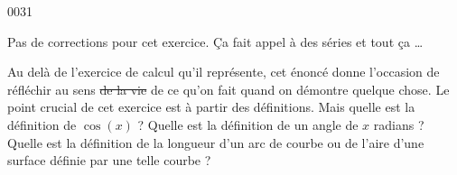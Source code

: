 
\begin{corrige}{0031}

Pas de corrections pour cet exercice. Ça fait appel à des séries et tout ça \ldots

 Au delà de l'exercice de calcul qu'il représente, cet énoncé donne l'occasion de réfléchir au sens \sout{de la vie} de ce qu'on fait quand on démontre quelque chose. Le point crucial de cet exercice est \og à partir des définitions\fg{}. Mais quelle est la définition de $\cos(x)$ ? Quelle est la définition de \og un angle de $x$ radians\fg{} ? Quelle est la définition de la longueur d'un arc de courbe ou de l'aire d'une surface définie par une telle courbe ?

\end{corrige}
